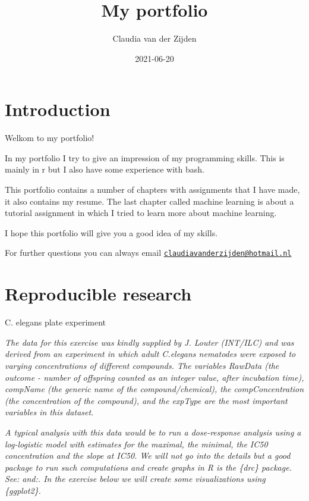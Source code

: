 \documentclass[
]{book}
\title{My portfolio}
\author{Claudia van der Zijden}
\date{2021-06-20}
\begin{document}
\maketitle

{
\setcounter{tocdepth}{1}
\tableofcontents
}
\hypertarget{introduction}{%
\chapter{Introduction}\label{introduction}}

Welkom to my portfolio!

In my portfolio I try to give an impression of my programming skills. This is mainly in r but I also have some experience with bash.

This portfolio contains a number of chapters with assignments that I have made, it also contains my resume. The last chapter called machine learning is about a tutorial assignment in which I tried to learn more about machine learning.

I hope this portfolio will give you a good idea of my skills.

For further questions you can always email \href{mailto:claudiavanderzijden@hotmail.nl}{\nolinkurl{claudiavanderzijden@hotmail.nl}}

\hypertarget{reproducible-research}{%
\chapter{Reproducible research}\label{reproducible-research}}

C. elegans plate experiment

\emph{The data for this exercise was kindly supplied by J. Louter (INT/ILC) and was derived from an experiment in which adult C.elegans nematodes were exposed to varying concentrations of different compounds. The variables RawData (the outcome - number of offspring counted as an integer value, after incubation time), compName (the generic name of the compound/chemical), the compConcentration (the concentration of the compound), and the expType are the most important variables in this dataset.}

\emph{A typical analysis with this data would be to run a dose-response analysis using a log-logistic model with estimates for the maximal, the minimal, the IC50 concentration and the slope at IC50. We will not go into the details but a good package to run such computations and create graphs in R is the \{drc\} package. See: and:. In the exercise below we will create some visualizations using \{ggplot2\}.}
\end{document}
